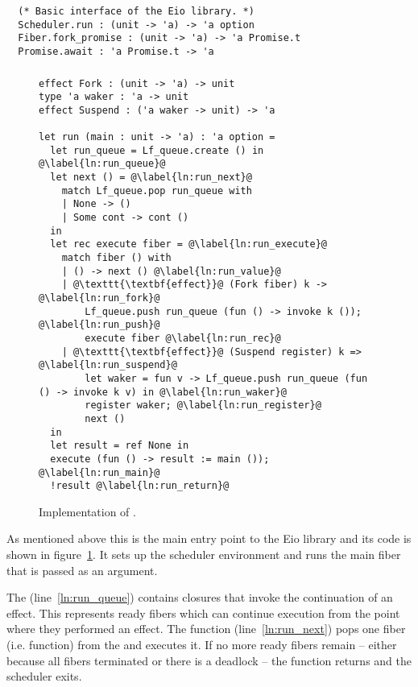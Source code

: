 \begin{verbatim}
  (* Basic interface of the Eio library. *)
  Scheduler.run : (unit -> 'a) -> 'a option
  Fiber.fork_promise : (unit -> 'a) -> 'a Promise.t
  Promise.await : 'a Promise.t -> 'a
\end{verbatim}

\subsubsection{}
\label{sec:sched-impl-run}

\begin{figure}[ht]
    \begin{verbatim}
effect Fork : (unit -> 'a) -> unit
type 'a waker : 'a -> unit
effect Suspend : ('a waker -> unit) -> 'a

let run (main : unit -> 'a) : 'a option =
  let run_queue = Lf_queue.create () in @\label{ln:run_queue}@
  let next () = @\label{ln:run_next}@
    match Lf_queue.pop run_queue with
    | None -> ()
    | Some cont -> cont () 
  in
  let rec execute fiber = @\label{ln:run_execute}@
    match fiber () with
    | () -> next () @\label{ln:run_value}@
    | @\texttt{\textbf{effect}}@ (Fork fiber) k -> @\label{ln:run_fork}@
        Lf_queue.push run_queue (fun () -> invoke k ()); @\label{ln:run_push}@
        execute fiber @\label{ln:run_rec}@
    | @\texttt{\textbf{effect}}@ (Suspend register) k => @\label{ln:run_suspend}@
        let waker = fun v -> Lf_queue.push run_queue (fun () -> invoke k v) in @\label{ln:run_waker}@ 
        register waker; @\label{ln:run_register}@
        next ()
  in
  let result = ref None in
  execute (fun () -> result := main ()); @\label{ln:run_main}@
  !result @\label{ln:run_return}@
  \end{verbatim}
    \caption{Implementation of .}
    \label{fig:sched-impl-run}
\end{figure}

As mentioned above this is the main entry point to the Eio library and its code is shown in figure~\ref{fig:sched-impl-run}.
It sets up the scheduler environment and runs the main fiber that is passed as an argument.

The  (line~\ref{ln:run_queue}) contains closures that invoke the continuation of an effect.
This represents ready fibers which can continue execution from the point where they performed an effect.
The  function (line~\ref{ln:run_next}) pops one fiber (i.e. function) from the  and executes it.
If no more ready fibers remain -- either because all fibers terminated or there is a deadlock -- the  function returns and the scheduler exits.

